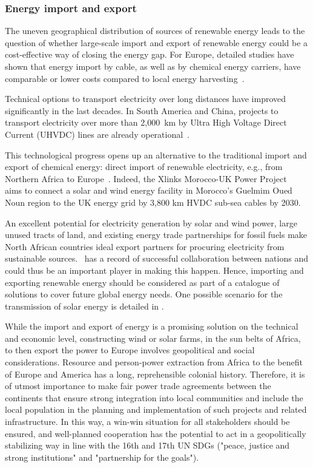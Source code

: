 \documentclass[../SustainableHEP.tex]{subfiles}
\begin{document}
\subsubsection{Energy import and export}
\label{subsec:import}
The uneven geographical distribution of sources of renewable energy leads to the question of whether large-scale import and export of renewable energy could be a cost-effective way of closing the energy gap. For Europe, detailed studies have shown that energy import by cable, as well as by chemical energy carriers, have comparable or lower costs compared to local energy harvesting~\cite{10.1371/journal.pone.0281380}.

Technical options to transport electricity over long distances have improved significantly in the last decades. In South America and China, projects to transport electricity over more than 2,000~km by Ultra High Voltage Direct Current (UHVDC) lines are already operational~\cite{Champion}.

This technological progress opens up an alternative to the traditional import and export of chemical energy: direct import of renewable electricity, e.g., from Northern Africa to Europe~\cite{Dueren,Dueren+2011+263+275}. Indeed, the Xlinks Morocco-UK Power Project~\cite{Xlinks} aims to connect a solar and wind energy facility in Morocco's Guelmim Oued Noun region to the UK energy grid by 3,800 km HVDC sub-sea cables by 2030.

An excellent potential for electricity generation by solar and wind power, large unused tracts of land, and existing energy trade partnerships for fossil fuels make North African countries ideal export partners for procuring electricity from sustainable sources.  \ACR\ has a record of successful collaboration between nations and could thus be an important player in making this happen.  Hence, importing and exporting renewable energy should be considered as part of a catalogue of solutions to cover future global energy needs.  One possible scenario for the transmission of solar energy is detailed in . 

While the import and export of energy is a promising solution on the technical and economic level, constructing wind or solar farms, \eg in the sun belts of Africa, to then export the power to Europe involves geopolitical and social considerations. Resource and person-power extraction from Africa to the benefit of Europe and America has a long, reprehensible colonial history. Therefore, it is of utmost importance to make fair power trade agreements between the continents that ensure strong integration into local communities and include the local population in the planning and implementation of such projects and related infrastructure. In this way, a win-win situation for all stakeholders should be ensured, and well-planned cooperation has the potential to act in a geopolitically stabilizing way in line with the 16th and 17th UN SDGs ("peace, justice and strong institutions" and "partnership for the goals"). 
\end{document}
